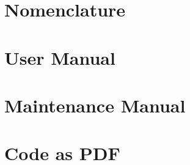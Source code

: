\documentclass[11pt]{report}
\begin{document}
  \begin{appendices}
    \chapter{Nomenclature}
    \label{cha:glossary}
    
      
    
    \chapter{User Manual}
    \label{cha:user}
      
      
    
    \chapter{Maintenance Manual}
    \label{cha:maint}
    
      
    
    \chapter{Code as PDF}
    \label{cha:code}
  \end{appendices}
    
    \clearpage
    \nocite{*} %
    
\end{document}
